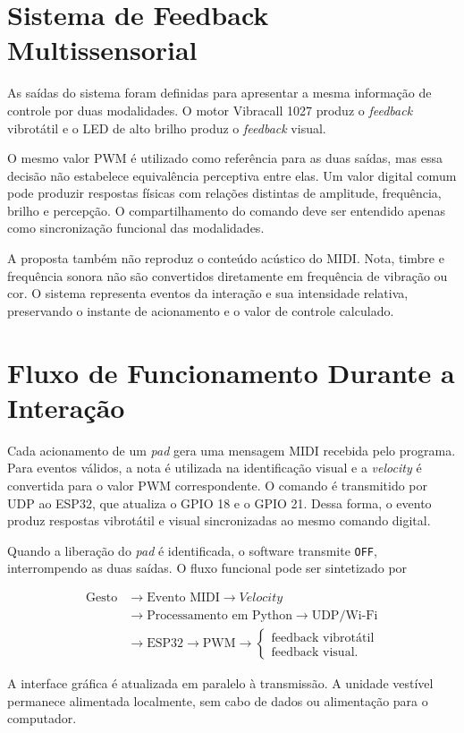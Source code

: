 \section{Sistema de Feedback Multissensorial}
\label{sec:feedback_vibrotatil}

As saídas do sistema foram definidas para apresentar a mesma informação de controle por duas modalidades. O motor Vibracall 1027 produz o \textit{feedback} vibrotátil e o LED de alto brilho produz o \textit{feedback} visual.

O mesmo valor PWM é utilizado como referência para as duas saídas, mas essa decisão não estabelece equivalência perceptiva entre elas. Um valor digital comum pode produzir respostas físicas com relações distintas de amplitude, frequência, brilho e percepção. O compartilhamento do comando deve ser entendido apenas como sincronização funcional das modalidades.

A proposta também não reproduz o conteúdo acústico do MIDI. Nota, timbre e frequência sonora não são convertidos diretamente em frequência de vibração ou cor. O sistema representa eventos da interação e sua intensidade relativa, preservando o instante de acionamento e o valor de controle calculado.

\section{Fluxo de Funcionamento Durante a Interação}
\label{sec:fluxo_funcionamento}

Cada acionamento de um \textit{pad} gera uma mensagem MIDI recebida pelo programa. Para eventos válidos, a nota é utilizada na identificação visual e a \textit{velocity} é convertida para o valor PWM correspondente. O comando é transmitido por UDP ao ESP32, que atualiza o GPIO 18 e o GPIO 21. Dessa forma, o evento produz respostas vibrotátil e visual sincronizadas ao mesmo comando digital.

Quando a liberação do \textit{pad} é identificada, o software transmite \texttt{OFF}, interrompendo as duas saídas. O fluxo funcional pode ser sintetizado por

\begin{equation}
\begin{split}
\text{Gesto}
&\rightarrow
\text{Evento MIDI}
\rightarrow
\textit{Velocity}\\
&\rightarrow
\text{Processamento em Python}
\rightarrow
\text{UDP/Wi-Fi}\\
&\rightarrow
\text{ESP32}
\rightarrow
\text{PWM}
\rightarrow
\begin{cases}
\text{feedback vibrotátil}\\
\text{feedback visual}.
\end{cases}
\end{split}
\end{equation}

A interface gráfica é atualizada em paralelo à transmissão. A unidade vestível permanece alimentada localmente, sem cabo de dados ou alimentação para o computador.
